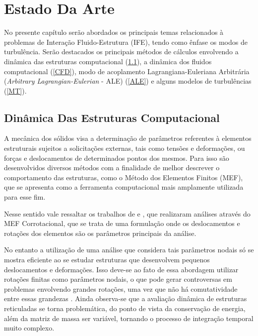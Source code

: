 \documentclass[_ArquivoPrincipal.tex]{subfiles}
\begin{document}
\chapter{Estado Da Arte}
	
No presente capítulo serão abordados os principais temas relacionados à problemas de Interação Fluido-Estrutura (IFE), tendo como ênfase os modos de turbulência. Serão destacados os principais métodos de cálculos envolvendo a dinâmica das estruturas computacional (\ref{CSD}), a dinâmica dos fluidos computacional (\ref{CFD}), modo de acoplamento Lagrangiana-Euleriana Arbitrária (\textit{Arbitrary Lagrangian-Eulerian} - ALE) (\ref{ALE}) e alguns modelos de turbulências (\ref{MT}).

\section{Dinâmica Das Estruturas Computacional} \label{CSD}

A mecânica dos sólidos visa a determinação de parâmetros referentes à elementos estruturais sujeitos a solicitações externas, tais como tensões e deformações, ou forças e deslocamentos de determinados pontos dos mesmos. Para isso são desenvolvidos diversos métodos com a finalidade de melhor descrever o comportamento das estruturas, como o Método dos Elementos Finitos (MEF), que se apresenta como a ferramenta computacional mais amplamente utilizada para esse fim.

Nesse sentido vale ressaltar os trabalhos de  e , que realizaram análises através do MEF Corrotacional, que se trata de uma formulação onde os deslocamentos e rotações dos elementos são os parâmetros principais da análise.

No entanto a utilização de uma análise que considera tais parâmetros nodais só se mostra eficiente ao se estudar estruturas que desenvolvem pequenos deslocamentos e deformações. Isso deve-se ao fato de essa abordagem utilizar rotações finitas como parâmetros nodais, o que pode gerar controversas em problemas envolvendo grandes rotações, uma vez que não há comutatividade entre essas grandezas \cite{sanches2013unconstrained}. Ainda observa-se que a avaliação dinâmica de estruturas reticuladas se torna problemática, do ponto de vista da conservação de energia, além da matriz de massa ser variável, tornando o processo de integração temporal muito complexo.
\end{document}
